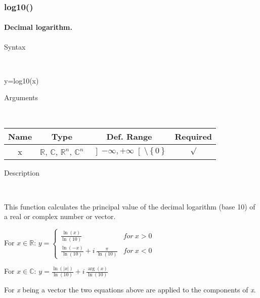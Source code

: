 \newpage
\subsubsection*{\hypertarget{log10}{}{\Large log10()}}


\paragraph{\label{par:Decimal-logarithm}Decimal logarithm.}

\begin{description}
\item [Syntax]~
\end{description}
y=log10(x)

\begin{description}
\item [Arguments]~
\end{description}
\begin{tabular}{|c|c|c|c|}
\hline 
Name&
Type&
Def. Range&
Required\tabularnewline
\hline
\hline 
x&
$\mathbb{R}$, $\mathbb{C}$, $\mathbb{R}^{n}$, $\mathbb{C}^{n}$&
$\left]-\infty,+\infty\right[\setminus\left\{ 0\right\} $&
$\surd$\tabularnewline
\hline
\end{tabular}

\begin{description}
\item [Description]~
\end{description}
This function calculates the principal value of the decimal logarithm
(base 10) of a real or complex number or vector.

\medskip{}
For $x\in\mathbb{R}$: $y=\left\{ \begin{array}{cc}
{\displaystyle \frac{\ln\left(x\right)}{\ln\left(10\right)}} & for\: x>0\\
{\displaystyle \frac{\ln\left(-x\right)}{\ln\left(10\right)}}+i\,{\displaystyle \frac{\pi}{\ln\left(10\right)}} & for\: x<0\end{array}\right.$ 

\medskip{}
For $x\in\mathbb{C}$: $y={\displaystyle \frac{\ln\left(\left|x\right|\right)}{\ln\left(10\right)}}+i\,{\displaystyle \frac{\arg\left(x\right)}{\ln\left(10\right)}}$
\medskip{}

For \textit{x} being a vector the two equations above are
applied to the components of \textit{x}.

